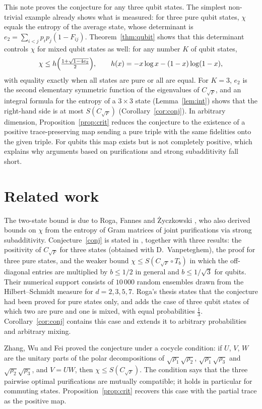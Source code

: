 \documentclass[11pt,a4paper]{article}
\theoremstyle{definition}
\theoremstyle{plain}
\newcommand{\CF}{C_{\sqrt F}}
\begin{document}
This note proves the conjecture for any three qubit states. The simplest
non-trivial example already shows what is measured: for three pure qubit
states, $\chi$ equals the entropy of the average state, whose determinant is
$e_2=\sum_{i<j}p_ip_j(1-F_{ij})$. Theorem~\ref{thm:qubit} shows that this
determinant controls $\chi$ for mixed qubit states as well: for any number $K$
of qubit states,
\[
\chi\le h\Bigl(\tfrac{1+\sqrt{1-4e_2}}{2}\Bigr),\qquad
h(x)=-x\log x-(1-x)\log(1-x),
\]
with equality exactly when all states are pure or all are equal. For $K=3$,
$e_2$ is the second elementary symmetric function of the eigenvalues of $\CF$,
and an integral formula for the entropy of a $3\times3$ state
(Lemma~\ref{lem:int}) shows that the right-hand side is at most $S(\CF)$
(Corollary~\ref{cor:conj}). In arbitrary dimension,
Proposition~\ref{prop:crit} reduces the conjecture to the existence of a
positive trace-preserving map sending a pure triple with the same fidelities
onto the given triple. For qubits this map exists but is not completely
positive, which explains why arguments based on purifications and strong
subadditivity fall short.

\section{Related work}\label{sec:related}
The two-state bound is due to Roga, Fannes and \.Zyczkowski \cite{RFZ2010}, who
also derived bounds on $\chi$ from the entropy of Gram matrices of joint
purifications via strong subadditivity. Conjecture~\ref{conj} is stated in
\cite{FdMRZ2012}, together with three results: the positivity of $\CF$ for three
states (obtained with D.~Vanpeteghem), the proof for three pure states, and the
weaker bound $\chi\le S(\CF\circ T_b)$ in which the off-diagonal entries are
multiplied by $b\le1/2$ in general and $b\le1/\sqrt3$ for qubits. Their
numerical support consists of $10\,000$ random ensembles drawn from the
Hilbert--Schmidt measure for $d=2,3,5,7$. Roga's thesis \cite{Roga2011}
states that the conjecture had been proved for pure states only, and adds the
case of three qubit states of which two are pure and one is mixed, with equal
probabilities $\tfrac13$. Corollary~\ref{cor:conj} contains this case and
extends it to arbitrary probabilities and arbitrary mixing.

Zhang, Wu and Fei \cite{ZWF2012} proved the conjecture under a cocycle
condition: if $U$, $V$, $W$ are the unitary parts of the polar decompositions
of $\sqrt{\rho_1}\sqrt{\rho_2}$, $\sqrt{\rho_1}\sqrt{\rho_3}$ and
$\sqrt{\rho_2}\sqrt{\rho_3}$, and $V=UW$, then $\chi\le S(\CF)$. The condition
says that the three pairwise optimal purifications are mutually compatible; it
holds in particular for commuting states. Proposition~\ref{prop:crit} recovers
this case with the partial trace as the positive map.
\end{document}
